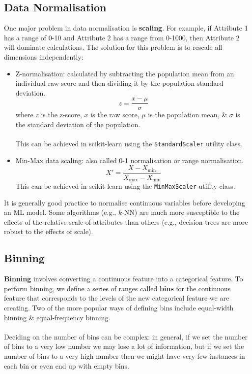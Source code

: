\documentclass[a4paper,11pt]{article}
\begin{document}
\subsection{Data Normalisation}
One major problem in data normalisation is \textbf{scaling}.
For example, if Attribute 1 has a range of 0-10 and Attribute 2 has a range from 0-1000, then Attribute 2 will dominate calculations.
The solution for this problem is to rescale all dimensions independently:
\begin{itemize}
    \item   Z-normalisation: calculated by subtracting the population mean from an individual raw score and then dividing it by the population standard deviation.
            \[
                z = \frac{x - \mu}{\sigma}
            \]
            where $z$ is the z-score, $x$ is the raw score, $\mu$ is the population mean, \& $\sigma$ is the standard deviation of the population. 
            \\\\
            This can be achieved in scikit-learn using the \texttt{StandardScaler} utility class.

    \item   Min-Max data scaling: also called 0-1 normalisation or range normalisation.
            \[
                X' = \frac{X - X_{\text{min}}}{X_{\text{max}} - X_{\text{min}}}
            \]
            This can be achieved in scikit-learn using the \texttt{MinMaxScaler} utility class.
\end{itemize}

It is generally good practice to normalise continuous variables before developing an ML model.
Some algorithms (e.g., $k$-NN) are much more susceptible to the effects of the relative scale of attributes than others (e.g., decision trees are more robust to the effects of scale).

\subsection{Binning}
\textbf{Binning} involves converting a continuous feature into a categorical feature.
To perform binning, we define a series of ranges called \textbf{bins} for the continuous feature that corresponds to the levels of the new categorical feature we are creating.
Two of the more popular ways of defining bins include equal-width binning \& equal-frequency binning.
\\\\
Deciding on the number of bins can be complex:
in general, if we set the number of bins to a very low number we may lose a lot of information, but if we set the number of bins to a very high number then we might have very few instances in each bin or even end up with empty bins.
\end{document}
